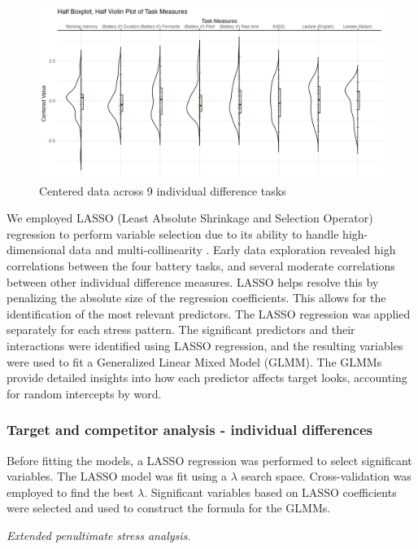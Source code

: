 \begin{figure}[H]
  \centering
  \includegraphics[width=1\linewidth]{visuals/plot_raw_task.jpeg} %
  \caption{Centered data across 9 individual difference tasks}
  \label{fig:plot_raw_task}
\end{figure}


We employed LASSO (Least Absolute Shrinkage and Selection Operator) regression to perform variable selection due to its ability to handle high-dimensional data and multi-collinearity \citep{Zhang2020, Tibshirani1996}. Early data exploration revealed high correlations between the four battery tasks, and several moderate correlations between other individual difference measures. LASSO helps resolve this by penalizing the absolute size of the regression coefficients. This allows for the identification of the most relevant predictors. The LASSO regression was applied separately for each stress pattern. The significant predictors and their interactions were identified using LASSO regression, and the resulting variables were used to fit a Generalized Linear Mixed Model (GLMM). The GLMMs provide detailed insights into how each predictor affects target looks, accounting for random intercepts by word.


\subsubsection{Target and competitor analysis - individual differences}

Before fitting the models, a LASSO regression was performed to select significant variables. The LASSO model was fit using a $\lambda$ search space. Cross-validation was employed to find the best $\lambda$. Significant variables based on LASSO coefficients were selected and used to construct the formula for the GLMMs.

\textit{Extended penultimate stress analysis}. 

